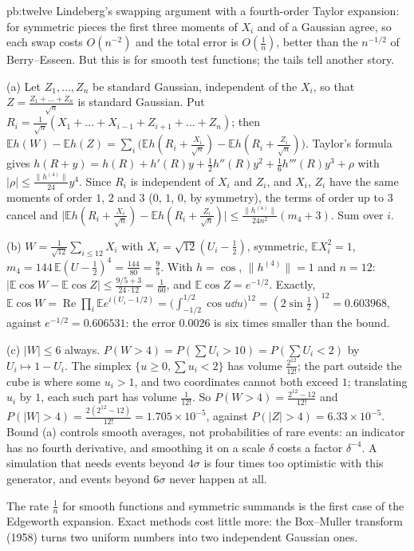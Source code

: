 \begin{solution}{pb:twelve}
\idea Lindeberg's swapping argument with a fourth-order Taylor expansion: for symmetric pieces the first three moments of $X_i$ and of a Gaussian agree, so each swap
costs $O(n^{-2})$ and the total error is $O(\frac1n)$, better than the $n^{-1/2}$ of Berry--Esseen. But this is for smooth test functions; the tails tell another story.

\writeup (a) Let $Z_1,\dots,Z_n$ be standard Gaussian, independent of the $X_i$, so that $Z=\frac{Z_1+\dots+Z_n}{\sqrt n}$ is standard Gaussian. Put
$R_i=\frac1{\sqrt n}(X_1+\dots+X_{i-1}+Z_{i+1}+\dots+Z_n)$; then $\mathbb Eh(W)-\mathbb Eh(Z)=\sum_i\bigl(\mathbb Eh(R_i+\frac{X_i}{\sqrt n})-\mathbb Eh(R_i+\frac{Z_i}{\sqrt n})\bigr)$. Taylor's formula gives
$h(R+y)=h(R)+h'(R)y+\frac12h''(R)y^2+\frac16h'''(R)y^3+\rho$ with $|\rho|\le\frac{\|h^{(4)}\|}{24}y^4$. Since $R_i$ is independent of $X_i$ and $Z_i$, and $X_i$, $Z_i$
have the same moments of order $1$, $2$ and $3$ ($0$, $1$, $0$, by symmetry), the terms of order up to $3$ cancel and
$\bigl|\mathbb Eh(R_i+\frac{X_i}{\sqrt n})-\mathbb Eh(R_i+\frac{Z_i}{\sqrt n})\bigr|\le\frac{\|h^{(4)}\|}{24n^2}(m_4+3)$. Sum over $i$.

(b) $W=\frac1{\sqrt{12}}\sum_{i\le12}X_i$ with $X_i=\sqrt{12}(U_i-\frac12)$, symmetric, $\mathbb EX_i^2=1$, $m_4=144\,\mathbb E(U-\frac12)^4=\frac{144}{80}=\frac95$. With $h=\cos$,
$\|h^{(4)}\|=1$ and $n=12$: $|\mathbb E\cos W-\mathbb E\cos Z|\le\frac{9/5+3}{24\cdot12}=\frac1{60}$, and $\mathbb E\cos Z=e^{-1/2}$. Exactly,
$\mathbb E\cos W=\operatorname{Re}\prod_i\mathbb Ee^{i(U_i-1/2)}=\bigl(\int_{-1/2}^{1/2}\cos u\dd u\bigr)^{12}=(2\sin\tfrac12)^{12}=0.603968$, against $e^{-1/2}=0.606531$: the error
$0.0026$ is six times smaller than the bound.

(c) $|W|\le6$ always. $P(W>4)=P(\sum U_i>10)=P(\sum U_i<2)$ by $U_i\mapsto1-U_i$. The simplex $\{u\ge0,\sum u_i<2\}$ has volume $\frac{2^{12}}{12!}$; the part outside
the cube is where some $u_i>1$, and two coordinates cannot both exceed $1$; translating $u_i$ by $1$, each such part has volume $\frac1{12!}$. So
$P(W>4)=\frac{2^{12}-12}{12!}$ and $P(|W|>4)=\frac{2(2^{12}-12)}{12!}=1.705\times10^{-5}$, against $P(|Z|>4)=6.33\times10^{-5}$. Bound (a) controls smooth averages, not
probabilities of rare events: an indicator has no fourth derivative, and smoothing it on a scale $\delta$ costs a factor $\delta^{-4}$. A simulation that needs
events beyond $4\sigma$ is four times too optimistic with this generator, and events beyond $6\sigma$ never happen at all.

\leads The rate $\frac1n$ for smooth functions and symmetric summands is the first case of the Edgeworth expansion. Exact methods cost little more: the Box--Muller transform
(1958) turns two uniform numbers into two independent Gaussian ones.
\end{solution}

